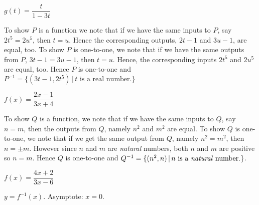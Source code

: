 \documentclass{ximera}
\begin{document}
\begin{question}
$g(t) = \dfrac{t}{1-3t}$

\begin{solution}
To show $P$ is a function we note that if we have the same inputs to $P$, say $2t^{5} = 2u^{5}$, then $t = u$.  Hence the corresponding outputs, $2t-1$ and $3u-1$, are equal, too. To show $P$ is one-to-one, we note that if we have the same outputs from $P$, $3t-1 = 3u-1$, then $t = u$.  Hence, the corresponding  inputs $2t^5$  and $2u^5$ are equal, too. Hence $P$ is one-to-one and $P^{-1} = \{ (3t-1, 2t^5) \, | \, \text{$t$ is a real number.} \}$
\end{solution}

\end{question}

\begin{question}
$f(x) = \dfrac{2x-1}{3x+4}$
\begin{solution}
To show $Q$ is a function, we note that if we have the same inputs to $Q$, say $n = m$, then the outputs from $Q$, namely $n^2$ and $m^2$ are equal. To show $Q$ is one-to-one, we note that if we get the same output from $Q$, namely $n^2 = m^2$, then $n = \pm m$.  However since $n$ and $m$ are \textit{natural} numbers, both $n$ and $m$ are positive so $n = m$. Hence $Q$ is one-to-one and $Q^{-1} = \{ (n^2, n) \, | \, \text{$n$ is a \textit{natural} number.} \}$.
\end{solution}

\end{question}

\begin{question}
$f(x) = \dfrac{4x + 2}{3x - 6}$

\begin{solution}
$y = f^{-1}(x)$. Asymptote: $x = 0$.

% 
\end{solution}

\end{question}
\end{document}
